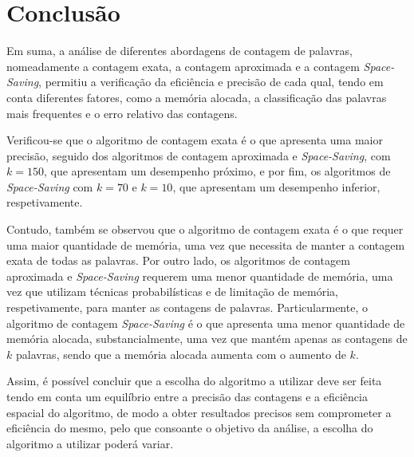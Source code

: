 \documentclass[mirror, portugues]{revdetua}
\begin{document}
\section{Conclusão}

Em suma, a análise de diferentes abordagens de contagem de palavras, nomeadamente a contagem exata, a contagem aproximada e a contagem \textit{Space-Saving}, permitiu a verificação da eficiência e precisão de cada qual, tendo em conta diferentes fatores, como a memória alocada, a classificação das palavras mais frequentes e o erro relativo das contagens.

Verificou-se que o algoritmo de contagem exata é o que apresenta uma maior precisão, seguido dos algoritmos de contagem aproximada e \textit{Space-Saving}, com $k = 150$, que apresentam um desempenho próximo, e por fim, os algoritmos de \textit{Space-Saving} com $k = 70$ e $k=10$, que apresentam um desempenho inferior, respetivamente. 

Contudo, também se observou que o algoritmo de contagem exata é o que requer uma maior quantidade de memória, uma vez que necessita de manter a contagem exata de todas as palavras. Por outro lado, os algoritmos de contagem aproximada e \textit{Space-Saving} requerem uma menor quantidade de memória, uma vez que utilizam técnicas probabilísticas e de limitação de memória, respetivamente, para manter as contagens de palavras. Particularmente, o algoritmo de contagem \textit{Space-Saving} é o que apresenta uma menor quantidade de memória alocada, substancialmente, uma vez que mantém apenas as contagens de $k$ palavras, sendo que a memória alocada aumenta com o aumento de $k$.

Assim, é possível concluir que a escolha do algoritmo a utilizar deve ser feita tendo em conta um equilíbrio entre a precisão das contagens e a eficiência espacial do algoritmo, de modo a obter resultados precisos sem comprometer a eficiência do mesmo, pelo que consoante o objetivo da análise, a escolha do algoritmo a utilizar poderá variar.


\end{document}
